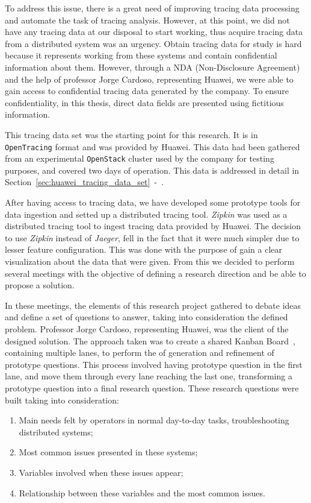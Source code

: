 To address this issue, there is a great need of improving tracing data processing and automate the task of tracing analysis. However, at this point, we did not have any tracing data at our disposal to start working, thus acquire tracing data from a distributed system was an urgency. Obtain tracing data for study is hard because it represents working from these systems and contain confidential information about them. However, through a NDA (Non-Disclosure Agreement) and the help of professor Jorge Cardoso, representing Huawei, we were able to gain access to confidential tracing data generated by the company. To ensure confidentiality, in this thesis, direct data fields are presented using fictitious information. 

This tracing data set was the starting point for this research. It is in \texttt{OpenTracing} format and was provided by Huawei. This data had been gathered from an experimental \texttt{OpenStack} cluster used by the company for testing purposes, and covered two days of operation. This data is addressed in detail in Section~\ref{sec:huawei_tracing_data_set}~-~.

After having access to tracing data, we have developed some prototype tools for data ingestion and setted up a distributed tracing tool. \emph{Zipkin} was used as a distributed tracing tool to ingest tracing data provided by Huawei. The decision to use \emph{Zipkin} instead of \emph{Jaeger}, fell in the fact that it were much simpler due to lesser feature configuration. This was done with the purpose of gain a clear visualization about the data that were given. From this we decided to perform several meetings with the objective of defining a research direction and be able to propose a solution.

In these meetings, the elements of this research project gathered to debate ideas and define a set of questions to answer, taking into consideration the defined problem. Professor Jorge Cardoso, representing Huawei, was the client of the designed solution. The approach taken was to create a shared Kanban Board~\cite{Ikonen2011}, containing multiple lanes, to perform the of generation and refinement of prototype questions. This process involved having prototype question in the first lane, and move them through every lane reaching the last one, transforming a prototype question into a final research question. These research questions were built taking into consideration:

\begin{enumerate}
    \item Main needs felt by operators in normal day-to-day tasks, troubleshooting distributed systems;
    \item Most common issues presented in these systems;
    \item Variables involved when these issues appear;
    \item Relationship between these variables and the most common issues.
\end{enumerate}

